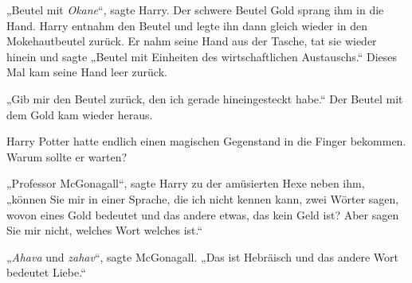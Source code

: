 
„Beutel mit \emph{Okane}“, sagte Harry. Der schwere Beutel Gold sprang ihm in die Hand. Harry entnahm den Beutel und legte ihn dann gleich wieder in den Mokehautbeutel zurück. Er nahm seine Hand aus der Tasche, tat sie wieder hinein und sagte „Beutel mit Einheiten des wirtschaftlichen Austauschs.“ Dieses Mal kam seine Hand leer zurück.

„Gib mir den Beutel zurück, den ich gerade hineingesteckt habe.“ Der Beutel mit dem Gold kam wieder heraus.

Harry Potter hatte endlich einen magischen Gegenstand in die Finger bekommen. Warum sollte er warten?

„Professor McGonagall“, sagte Harry zu der amüsierten Hexe neben ihm, „können Sie mir in einer Sprache, die ich nicht kennen kann, zwei Wörter sagen, wovon eines Gold bedeutet und das andere etwas, das kein Geld ist? Aber sagen Sie mir nicht, welches Wort welches ist.“

„\emph{Ahava} und \emph{zahav}“, sagte McGonagall. „Das ist Hebräisch und das andere Wort bedeutet Liebe.“

